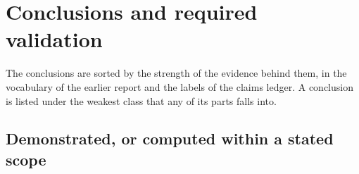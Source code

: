 \chapter{Conclusions and required validation}
\label{ch:conclusions}\label{ch:mono-conclusions}

The conclusions are sorted by the strength of the evidence behind them, in the vocabulary of the earlier report and the
labels of the claims ledger. A conclusion is listed under the weakest class that any of its parts falls into.

\section{Demonstrated, or computed within a stated scope}
\label{sec:concl-demonstrated}

